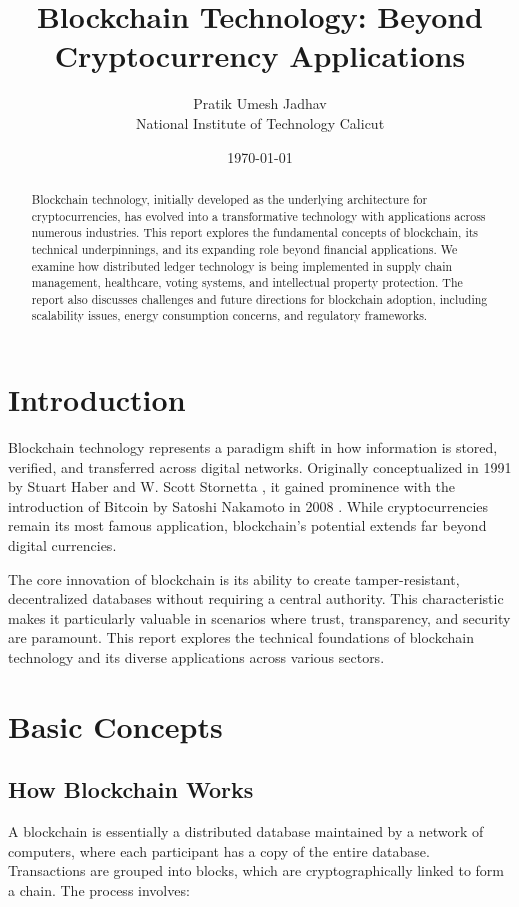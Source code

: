 \documentclass[11pt,a4paper]{article}
\title{Blockchain Technology: Beyond Cryptocurrency Applications}
\author{Pratik Umesh Jadhav \\ National Institute of Technology Calicut}
\date{\today}
\begin{document}
\maketitle

\begin{abstract}
Blockchain technology, initially developed as the underlying architecture for cryptocurrencies, has evolved into a transformative technology with applications across numerous industries. This report explores the fundamental concepts of blockchain, its technical underpinnings, and its expanding role beyond financial applications. We examine how distributed ledger technology is being implemented in supply chain management, healthcare, voting systems, and intellectual property protection. The report also discusses challenges and future directions for blockchain adoption, including scalability issues, energy consumption concerns, and regulatory frameworks.
\end{abstract}

\section{Introduction}
Blockchain technology represents a paradigm shift in how information is stored, verified, and transferred across digital networks. Originally conceptualized in 1991 by Stuart Haber and W. Scott Stornetta \cite{haber1991}, it gained prominence with the introduction of Bitcoin by Satoshi Nakamoto in 2008 \cite{nakamoto2008}. While cryptocurrencies remain its most famous application, blockchain's potential extends far beyond digital currencies.

The core innovation of blockchain is its ability to create tamper-resistant, decentralized databases without requiring a central authority. This characteristic makes it particularly valuable in scenarios where trust, transparency, and security are paramount. This report explores the technical foundations of blockchain technology and its diverse applications across various sectors.

\section{Basic Concepts}

\subsection{How Blockchain Works}
A blockchain is essentially a distributed database maintained by a network of computers, where each participant has a copy of the entire database. Transactions are grouped into blocks, which are cryptographically linked to form a chain. The process involves:
\end{document}
